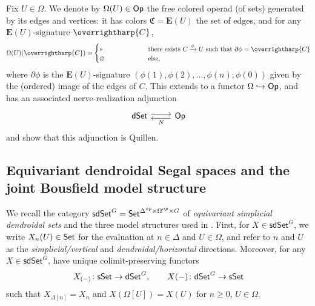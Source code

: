 \documentclass[a4paper,10pt
,draft
]{article}%
\renewcommand{\1}{\eta}%
\newcommand{\vect}[1]{\text{\overrightharp{\ensuremath{#1}}}}
\begin{document}
\begin{definition}
      \label{OT_DEF}
      Fix $U \in \Omega$.
      We denote by $\Omega(U) \in \mathsf{Op}$ the free colored operad (of sets) generated by its edges and vertices:
      it has colors $\mathfrak C = \mathbf E(U)$ the set of edges, and
      for any $\mathbf E(U)$-signature $\vect C$, 
      \begin{equation}
           \label{OMEGADEF_EQ}
            \Omega(U)(\vect C) =
            \begin{cases}
                  \** \qquad \qquad \qquad & \mbox{there exists $C \xrightarrow{\phi} U$ such that $\partial \phi = \vect C$}
                  \\
                  \varnothing & \text{else,}
            \end{cases}
      \end{equation}
      where $\partial \phi$ is the $\mathbf E(U)$-signature $(\phi(1), \phi(2), \dots, \phi(n); \phi(0))$
      given by the (ordered) image of the edges of $C$.
      This extends to a functor $\Omega \hookrightarrow \mathsf{Op}$, and has an associated nerve-realization adjunction
      \begin{equation}
            \label{DSETADJ_EQ}
            \begin{tikzcd}
                  \dSet \arrow[r, shift left]
                  &
                  \Op \arrow[l, shift left, "N"]
            \end{tikzcd}
      \end{equation}
      and \cite[Prop. 2.5]{CM11} show that this adjunction is Quillen.
\end{definition}









\subsection{Equivariant dendroidal Segal spaces and the joint Bousfield model structure}
\label{JT_SEC}

We recall the category $\mathsf{sdSet}^G = \mathsf{Set}^{\Delta^{op} \times \Omega^{op} \times G}$ of \textit{equivariant simplicial dendroidal sets} and the three model structures used in \cite{BP_edss}.
First, for $X \in \mathsf{sdSet}^G$, we write $X_n(U) \in \mathsf{Set}$ for the evaluation at $n \in \Delta$ and $U \in \Omega$,
and refer to $n$ and $U$ as the \textit{simplicial/vertical} and \textit{dendroidal/horizontal} directions.
Moreover, for any $X \in \mathsf{sdSet}^G$, have unique colimit-preserving functors
\begin{equation}
      \label{SDSET_EQ}
      X_{(-)} \colon \mathsf{sSet} \to \mathsf{dSet}^G,
      \qquad
      X(-) \colon \mathsf{dSet}^G \to \mathsf{sSet}
\end{equation}
such that $X_{\Delta[n]} = X_n$ and $X(\Omega[U]) = X(U)$ for $n \geq 0$, $U \in \Omega$.
\end{document}
